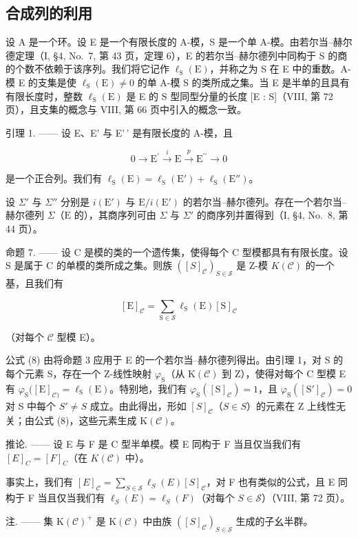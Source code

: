 \subsection{合成列的利用}

设 A 是一个环。设 E 是一个有限长度的 A-模，S 是一个单 A-模。由若尔当–赫尔德定理（I, §4, No.~7, 第 43 页，定理 6），E 的若尔当–赫尔德列中同构于 S 的商的个数不依赖于该序列。我们将它记作 \(\ell_{\mathrm{S}}(\mathrm{E})\)，并称之为 S 在 E 中的重数。A-模 E 的支集是使 \(\ell_{\mathrm{S}}(\mathrm{E}) \neq 0\) 的单 A-模 S 的类所成之集。当 E 是半单的且具有有限长度时，整数 \(\ell_{\mathrm{S}}(\mathrm{E})\) 是 E 的 S 型同型分量的长度 {[}E : S{]}（VIII, 第 72 页），且支集的概念与 VIII, 第 66 页中引入的概念一致。

引理 1. —— 设 E、E' 与 E'\,' 是有限长度的 A-模，且

\[
0 \longrightarrow \mathrm{E} ^ {\prime} \stackrel {i} {\longrightarrow} \mathrm{E} \stackrel {p} {\longrightarrow} \mathrm{E} ^ {\prime \prime} \longrightarrow 0
\]

是一个正合列。我们有 \(\ell_{\mathrm{S}}(\mathrm{E}) = \ell_{\mathrm{S}}(\mathrm{E}') + \ell_{\mathrm{S}}(\mathrm{E}'')\)。

设 \(\Sigma'\) 与 \(\Sigma''\) 分别是 \(i(\mathrm{E}')\) 与 \(\mathrm{E}/i(\mathrm{E}')\) 的若尔当–赫尔德列。存在一个若尔当–赫尔德列 \(\Sigma\)（\(\mathrm{E}\) 的），其商序列可由 \(\Sigma\) 与 \(\Sigma'\) 的商序列并置得到（I, §4, No.~8, 第 44 页）。

命题 7. —— 设 C 是模的类的一个遗传集，使得每个 C 型模都具有有限长度。设 S 是属于 C 的单模的类所成之集。则族 \(([S]_{\mathcal{C}})_{S \in \mathcal{S}}\) 是 Z-模 \(K(\mathcal{C})\) 的一个基，且我们有

\[
[ \mathrm{E} ] _ {\mathcal {C}} = \sum_ {\mathrm{S} \in \mathcal {S}} \ell_ {\mathrm{S}} (\mathrm{E}) [ \mathrm{S} ] _ {\mathcal {C}}\tag{8}
\]

（对每个 \(\mathcal{C}\) 型模 E）。

公式 (8) 由将命题 3 应用于 E 的一个若尔当–赫尔德列得出。由引理 1，对 S 的每个元素 S，存在一个 Z-线性映射 \(\varphi_{\mathrm{S}}\)（从 \(\mathrm{K}(\mathcal{C})\) 到 Z），使得对每个 C 型模 E 有 \(\varphi_{\mathrm{S}}([\mathrm{E}]_{\mathcal{C})} = \ell_{\mathrm{S}}(\mathrm{E})\)。特别地，我们有 \(\varphi_{\mathrm{S}}([\mathrm{S}]_{\mathcal{C}}) = 1\)，且 \(\varphi_{\mathrm{S}}([\mathrm{S}']_{\mathcal{C}}) = 0\) 对 S 中每个 \(S' \neq S\) 成立。由此得出，形如 \([S]_{\mathcal{C}}\)（\(S \in S\)）的元素在 Z 上线性无关；由公式 (8)，这些元素生成 \(\mathrm{K}(\mathcal{C})\)。

推论. —— 设 E 与 F 是 C 型半单模。模 E 同构于 F 当且仅当我们有 \([E]_{C} = [F]_{C}\)（在 \(K(\mathcal{C})\) 中）。

事实上，我们有 \([E]_{\mathcal{C}} = \sum_{S \in \mathcal{S}} \ell_{S}(E)[S]_{\mathcal{C}}\)，对 F 也有类似的公式，且 E 同构于 F 当且仅当我们有 \(\ell_{S}(E) = \ell_{S}(F)\)（对每个 \(S \in \mathcal{S}\)）（VIII, 第 72 页）。

注. —— 集 \(\mathrm{K}(\mathcal{C})^{+}\) 是 \(\mathrm{K}(\mathcal{C})\) 中由族 \(([S]_{\mathcal{C}})_{S\in\mathcal{S}}\) 生成的子幺半群。


